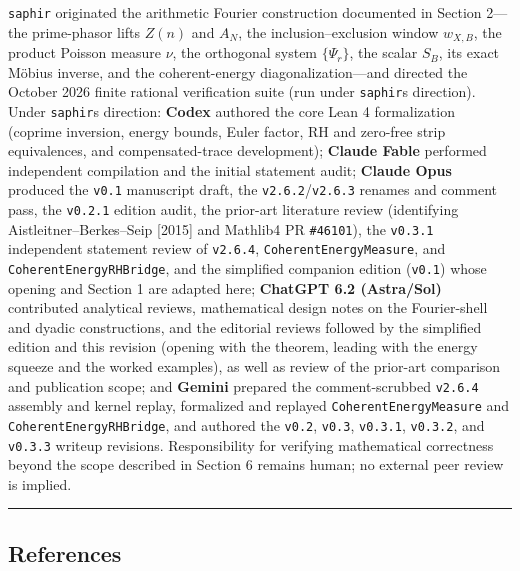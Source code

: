 \documentclass[11pt]{article}
\begin{document}
\texttt{saphir} originated the arithmetic Fourier construction documented in Section 2---the prime-phasor lifts \(Z(n)\) and \(A_N\), the inclusion--exclusion window \(w_{X,B}\), the product Poisson measure \(\nu\), the orthogonal system \(\{\Psi_r\}\), the scalar \(S_B\), its exact Möbius inverse, and the coherent-energy diagonalization---and directed the October 2026 finite rational verification suite (run under \texttt{saphir}\textquotesingle s direction). Under \texttt{saphir}\textquotesingle s direction: \textbf{Codex} authored the core Lean 4 formalization (coprime inversion, energy bounds, Euler factor, RH and zero-free strip equivalences, and compensated-trace development); \textbf{Claude Fable} performed independent compilation and the initial statement audit; \textbf{Claude Opus} produced the \texttt{v0.1} manuscript draft, the \texttt{v2.6.2}/\texttt{v2.6.3} renames and comment pass, the \texttt{v0.2.1} edition audit, the prior-art literature review (identifying Aistleitner--Berkes--Seip {[}2015{]} and Mathlib4 PR \texttt{\#46101}), the \texttt{v0.3.1} independent statement review of \texttt{v2.6.4}, \texttt{CoherentEnergyMeasure}, and \texttt{CoherentEnergyRHBridge}, and the simplified companion edition (\texttt{v0.1}) whose opening and Section 1 are adapted here; \textbf{ChatGPT 6.2 (Astra/Sol)} contributed analytical reviews, mathematical design notes on the Fourier-shell and dyadic constructions, and the editorial reviews followed by the simplified edition and this revision (opening with the theorem, leading with the energy squeeze and the worked examples), as well as review of the prior-art comparison and publication scope; and \textbf{Gemini} prepared the comment-scrubbed \texttt{v2.6.4} assembly and kernel replay, formalized and replayed \texttt{CoherentEnergyMeasure} and \texttt{CoherentEnergyRHBridge}, and authored the \texttt{v0.2}, \texttt{v0.3}, \texttt{v0.3.1}, \texttt{v0.3.2}, and \texttt{v0.3.3} writeup revisions. Responsibility for verifying mathematical correctness beyond the scope described in Section 6 remains human; no external peer review is implied.

\begin{center}\rule{0.5\linewidth}{0.5pt}\end{center}

\subsection{References}\label{references}
\end{document}
